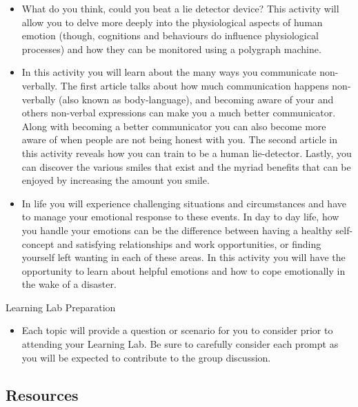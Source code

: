\documentclass[
]{book}
\providecommand{\tightlist}{%
  \setlength{\itemsep}{0pt}\setlength{\parskip}{0pt}}
\begin{document}
\begin{reflect}
\begin{itemize}
\tightlist
\item
  What do you think, could you beat a lie detector device? This activity will allow you to delve more deeply into the physiological aspects of human emotion (though, cognitions and behaviours do influence physiological processes) and how they can be monitored using a polygraph machine.
\item
  In this activity you will learn about the many ways you communicate non-verbally. The first article talks about how much communication happens non-verbally (also known as body-language), and becoming aware of your and others non-verbal expressions can make you a much better communicator. Along with becoming a better communicator you can also become more aware of when people are not being honest with you. The second article in this activity reveals how you can train to be a human lie-detector. Lastly, you can discover the various smiles that exist and the myriad benefits that can be enjoyed by increasing the amount you smile.\\
\item
  In life you will experience challenging situations and circumstances and have to manage your emotional response to these events. In day to day life, how you handle your emotions can be the difference between having a healthy self-concept and satisfying relationships and work opportunities, or finding yourself left wanting in each of these areas. In this activity you will have the opportunity to learn about helpful emotions and how to cope emotionally in the wake of a disaster.
\end{itemize}

{Learning Lab Preparation}

\begin{itemize}
\tightlist
\item
  Each topic will provide a question or scenario for you to consider prior to attending your Learning Lab. Be sure to carefully consider each prompt as you will be expected to contribute to the group discussion.
\end{itemize}
\end{reflect}

\hypertarget{resources-9}{%
\subsection*{Resources}\label{resources-9}}
\end{document}
